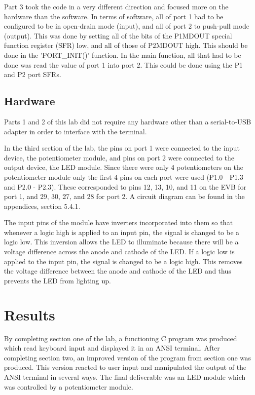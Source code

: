 \documentclass[12pt]{article}
\begin{document}
Part 3 took the code in a very different direction and focused more on the hardware than the software. In terms of software, all of port 1 had to be configured to be in open-drain mode (input), and all of port 2 to push-pull mode (output). This was done by setting all of the bits of the P1MDOUT special function register (SFR) low, and all of those of P2MDOUT high. This should be done in the 'PORT\_INIT()' function. In the main function, all that had to be done was read the value of port 1 into port 2. This could be done using the P1 and P2 port SFRs. 

\subsection{Hardware}

Parts 1 and 2 of this lab did not require any hardware other than a serial-to-USB adapter in order to interface with the terminal.

In the third section of the lab, the pins on port 1 were connected to the input device, the potentiometer module, and pins on port 2 were connected to the output device, the LED module. Since there were only 4 potentiometers on the potentiometer module only the first 4 pins on each port were used (P1.0 - P1.3 and P2.0 - P2.3). These corresponded to pins 12, 13, 10, and 11 on the EVB for port 1, and 29, 30, 27, and 28 for port 2. A circuit diagram can be found in the appendices, section 5.4.1.

The input pins of the module have inverters incorporated into them so that whenever a logic high is applied to an input pin, the signal is changed to be a logic low. This inversion allows the LED to illuminate because there will be a voltage difference across the anode and cathode of the LED. If a logic low is applied to the input pin, the signal is changed to be a logic high. This removes the voltage difference between the anode and cathode of the LED and thus prevents the LED from lighting up. 
 
\section{Results}

By completing section one of the lab, a functioning C program was produced which read keyboard input and displayed it in an ANSI terminal. After completing section two, an improved version of the program from section one was produced. This version reacted to user input and manipulated the output of the ANSI terminal in several ways. The final deliverable was an LED module which was controlled by a potentiometer module. 
\end{document}

